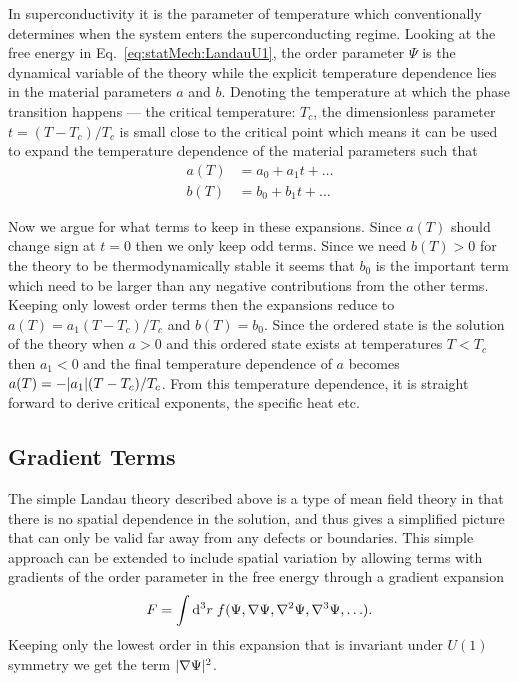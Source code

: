 In superconductivity it is the parameter of temperature which conventionally determines when the system enters the superconducting regime.
Looking at the free energy in Eq.~\eqref{eq:statMech:LandauU1}, the order parameter $\Psi$ is the dynamical variable 
of the theory while the explicit temperature dependence lies in the material parameters $a$ and $b$. Denoting the
temperature at which the phase transition happens --- the critical temperature: $T_c$, the dimensionless parameter
$t = (T-T_c)/T_c$ is small close to the critical point which means it can be used to expand the temperature dependence
of the material parameters such that
\begin{equation}
    \label{eq:statMech:matTempExpan}
    \begin{split}
        a(T) &= a_0 + a_1t + \ldots\\
        b(T) &= b_0 + b_1t + \ldots
    \end{split}
\end{equation}

Now we argue for what terms to keep in these expansions. Since $a(T)$ should change sign at $t=0$ then we only keep odd terms.
Since we need $b(T)>0$ for the theory to be thermodynamically stable it seems that $b_0$ is the important term which need to be
larger than any negative contributions from the other terms. Keeping only lowest order terms then the expansions reduce to
$a(T) = a_1(T-T_c)/T_c$ and $b(T) = b_0$. Since the ordered state is the solution of the theory when $a>0$ and this ordered
state exists at temperatures $T<T_c$ then $a_1<0$ and the final temperature dependence of $a$ becomes
$a(T) = -\lvert a_1 \rvert(T-T_c)/T_c$. From this temperature dependence, it is straight forward to derive critical exponents, the specific
heat etc.

\subsection{Gradient Terms}

The simple Landau theory described above is a type of mean field theory in that there is no spatial dependence in the
solution, and thus gives a simplified picture that can only be valid far away from any defects or boundaries. This simple approach
can be extended to include spatial variation by allowing terms with gradients of the order parameter in the free energy through
a gradient expansion
\begin{equation}
    \label{eq:statMech:gradTerms:gradExpansion}
    F = \int\mathop{\textrm{d}\kern0em^3r\kern0.1em}f(\Psi, \nabla\Psi, \nabla^2\Psi, \nabla^3\Psi, \ldots).
\end{equation}
Keeping only the lowest order in this expansion that is invariant under $U(1)$ symmetry we get the term
$\lvert \nabla\Psi \rvert^2$.

